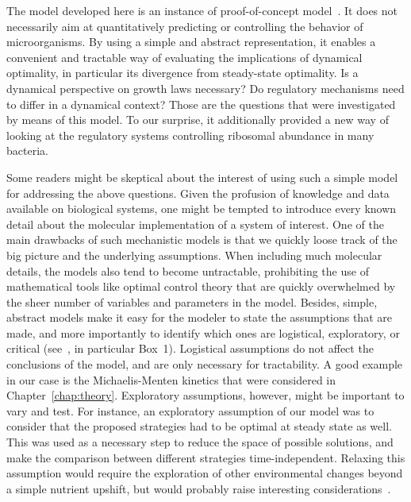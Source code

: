 The model developed here is an instance of proof-of-concept model~\cite{servedio_not_2014}.
It does not necessarily aim at quantitatively predicting or controlling the behavior of microorganisms.
By using a simple and abstract representation, it enables a convenient and tractable way of evaluating the implications of dynamical optimality, in particular its divergence from steady-state optimality.
Is a dynamical perspective on growth laws necessary?
Do regulatory mechanisms need to differ in a dynamical context?
Those are the questions that were investigated by means of this model. 
To our surprise, it additionally provided a new way of looking at the regulatory systems controlling ribosomal abundance in many bacteria.

Some readers might be skeptical about the interest of using such a simple model for addressing the above questions.
Given the profusion of knowledge and data available on biological systems, one might be tempted to introduce every known detail about the molecular implementation of a system of interest.
One of the main drawbacks of such mechanistic models is that we quickly loose track of the big picture and the underlying assumptions.
When including much molecular details, the models also tend to become untractable, prohibiting the use of mathematical tools like optimal control theory that are quickly overwhelmed by the sheer number of variables and parameters in the model.
Besides, simple, abstract models make it easy for the modeler to state the assumptions that are made, and more importantly to identify which ones are logistical, exploratory, or critical (see~\cite{servedio_not_2014}, in particular Box~1).
Logistical assumptions do not affect the conclusions of the model, and are only necessary for tractability.
A good example in our case is the Michaelis-Menten kinetics that were considered in Chapter~\ref{chap:theory}.
Exploratory assumptions, however, might be important to vary and test.
For instance, an exploratory assumption of our model was to consider that the proposed strategies had to be optimal at steady state as well.
This was used as a necessary step to reduce the space of possible solutions, and make the comparison between different strategies time-independent.
Relaxing this assumption would require the exploration of other environmental changes beyond a simple nutrient upshift, but would probably raise interesting considerations~\cite{geisel_constitutive_2011,lopez-maury_tuning_2008,lambert_memory_2014,kussell_phenotypic_2005}.

